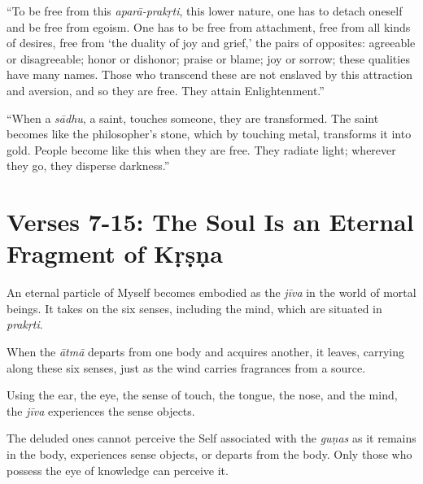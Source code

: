 \enquote{To be free from this \textit{aparā-prakṛti}, this lower nature, one has to detach oneself and be free from egoism. One has to be free from attachment, free from all kinds of desires, free from \enquote{the duality of joy and grief,} the pairs of opposites: agreeable or disagreeable; honor or dishonor; praise or blame; joy or sorrow; these qualities have many names. Those who transcend these are not enslaved by this attraction and aversion, and so they are free. They attain Enlightenment.}

\enquote{When a \textit{sādhu}, a saint, touches someone, they are transformed. The saint becomes like the philosopher’s stone, which by touching metal, transforms it into gold. People become like this when they are free. They radiate light; wherever they go, they disperse darkness.}

\section{Verses 7-15: The Soul Is an Eternal Fragment of Kṛṣṇa}\label{sec-verses-7-15-the-soul-is-an-eternal-fragment-of-krsna}

{An eternal particle of Myself becomes embodied as the \textit{jīva} in the world of mortal beings. It takes on the six senses, including the mind, which are situated in \textit{prakṛti}.}

{When the \textit{ātmā} departs from one body and acquires another, it leaves, carrying along these six senses, just as the wind carries fragrances from a source.}

{Using the ear, the eye, the sense of touch, the tongue, the nose, and the mind, the \textit{jīva} experiences the sense objects.}

{The deluded ones cannot perceive the Self associated with the \textit{guṇas} as it remains in the body, experiences sense objects, or departs from the body. Only those who possess the eye of knowledge can perceive it.}

